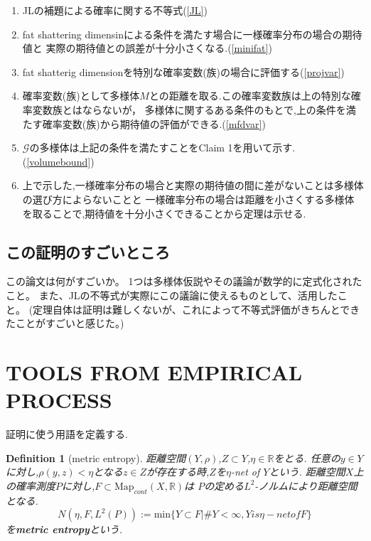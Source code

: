 \documentclass{jarticle}
\newtheorem{dfn}[thm]{Definition}
\begin{document}
\begin{enumerate}
  \item JLの補題による確率に関する不等式(\ref{JL})
  \item fat shattering dimensinによる条件を満たす場合に一様確率分布の場合の期待値と
       実際の期待値との誤差が十分小さくなる.(\ref{minifat})
  \item fat shatterig dimensionを特別な確率変数(族)の場合に評価する(\ref{projvar})
  \item 確率変数(族)として多様体$M$との距離を取る.この確率変数族は上の特別な確率変数族とはならないが，
       多様体に関するある条件のもとで,上の条件を満たす確率変数(族)から期待値の評価ができる.(\ref{mfdvar})
  \item $\mathcal{G}$の多様体は上記の条件を満たすことをClaim 1を用いて示す.(\ref{volumebound})
  \item 上で示した,一様確率分布の場合と実際の期待値の間に差がないことは多様体の選び方によらないことと
       一様確率分布の場合は距離を小さくする多様体を取ることで,期待値を十分小さくできることから定理は示せる.
\end{enumerate}

\subsection{この証明のすごいところ}
\label{sub-この証明のすごいところ}
この論文は何がすごいか。
1つは多様体仮説やその議論が数学的に定式化されたこと。
また、JLの不等式が実際にこの議論に使えるものとして、活用したこと。
(定理自体は証明は難しくないが、これによって不等式評価がきちんとできたことがすごいと感じた。)


\section{TOOLS FROM EMPIRICAL PROCESS}
\label{sec:TOOLS FROM EMPIRICAL PROCESS}
証明に使う用語を定義する.
\begin{dfn}[metric entropy]
 距離空間$(Y,\rho)$,$Z \subset Y$,$\eta \in \mathbb{R}$をとる.
 任意の$y \in Y$に対し,$\rho(y,z) <\eta$となる$z \in Z$が存在する時,$Z$を$\eta$-net of $Y$という.
 距離空間$X$上の確率測度$P$に対し,$F \subset \mathrm{Map}_{cont}(X,\mathbb{R})$は
 $P$の定める$L^2$-ノルムにより距離空間となる.
 \begin{equation*}
   N(\eta,F,L^2(P)):=\mathrm{min}\{ Y \subset F | \#Y < \infty, Y is \eta-net of F  \}
 \end{equation*}
 を\textbf{metric entropy}という.
\end{dfn}
\end{document}
